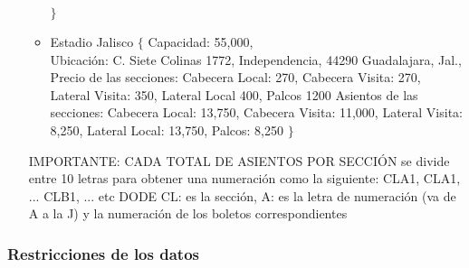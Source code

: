\begin{itemize}
\begin{itemize}
                                  $\}$        
        \item Estadio Jalisco     $\{$ Capacidad: 55,000, \\
                                       Ubicación: C. Siete Colinas 1772, Independencia, 44290 Guadalajara, Jal.,\\
                                       Precio de las secciones: Cabecera Local: 270, Cabecera Visita: 270, Lateral Visita: 350, Lateral Local 400, Palcos 1200
                                       Asientos de las secciones: Cabecera Local: 13,750, Cabecera Visita: 11,000, Lateral Visita: 8,250, Lateral Local: 13,750, Palcos: 8,250
                                  $\}$           
    \end{itemize}
    IMPORTANTE: CADA TOTAL DE ASIENTOS POR SECCIÓN se divide entre 10 letras para obtener una numeración como la siguiente: CLA1, CLA1, ... CLB1, ... etc
    DODE CL: es la sección, A: es la letra de numeración (va de A a la J) y la numeración de los boletos correspondientes 
\end{itemize}

\subsubsection*{Restricciones de los datos}

